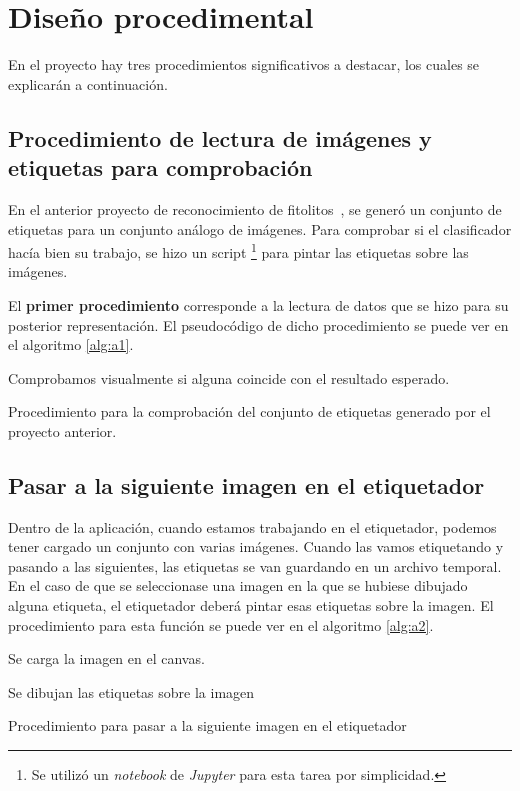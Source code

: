 \section{Diseño procedimental}
En el proyecto hay tres procedimientos significativos a destacar, los cuales se explicarán a continuación.

\subsection{Procedimiento de lectura de imágenes y etiquetas para comprobación}

En el anterior proyecto de reconocimiento de fitolitos~\cite{jaime}, se generó un conjunto de etiquetas para un conjunto análogo de imágenes.
Para comprobar si el clasificador hacía bien su trabajo, se hizo un script \footnote{Se utilizó un \textit{notebook} de \textit{Jupyter} para esta tarea por simplicidad.} para pintar las etiquetas sobre las imágenes.

El \textbf{primer procedimiento} corresponde a la lectura de datos que se hizo para su posterior representación.
El pseudocódigo de dicho procedimiento se puede ver en el algoritmo \ref{alg:a1}.

\begin{algorithm}
Comprobamos visualmente si alguna coincide con el resultado esperado.
	\caption{Procedimiento para la comprobación del conjunto de etiquetas generado por el proyecto anterior.}
	\label{alg:a1}
\end{algorithm}

\subsection{Pasar a la siguiente imagen en el etiquetador}
Dentro de la aplicación, cuando estamos trabajando en el etiquetador, podemos tener cargado un conjunto con varias imágenes.
Cuando las vamos etiquetando y pasando a las siguientes, las etiquetas se van guardando en un archivo temporal. En el caso de que se seleccionase una imagen en la que se hubiese dibujado alguna etiqueta, el etiquetador deberá pintar esas etiquetas sobre la imagen.
El procedimiento para esta función se puede ver en el algoritmo \ref{alg:a2}.


\begin{algorithm}
	{
		Se carga la imagen en el canvas.
		
		{
			Se dibujan las etiquetas sobre la imagen
			
			
		}
		
	}
	\caption{Procedimiento para pasar a la siguiente imagen en el etiquetador}
	\label{alg:a2}
\end{algorithm}

